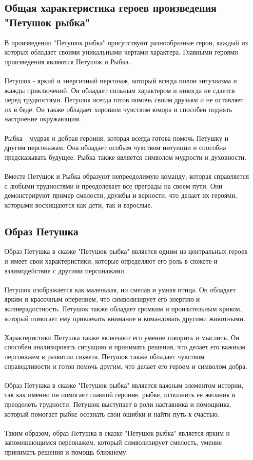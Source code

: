 \documentclass{article}
\begin{document}
\subsection{Общая характеристика героев произведения "{}{}Петушок рыбка"{}{}}
В произведении "{}{}Петушок рыбка"{}{} присутствуют разнообразные герои, каждый из которых обладает своими уникальными чертами характера. Главными героями произведения являются Петушок и Рыбка.\\
~\\
Петушок - яркий и энергичный персонаж, который всегда полон энтузиазма и жажды приключений. Он обладает сильным характером и никогда не сдается перед трудностями. Петушок всегда готов помочь своим друзьям и не оставляет их в беде. Он также обладает хорошим чувством юмора и способен поднять настроение окружающим.\\
~\\
Рыбка - мудрая и добрая героиня, которая всегда готова помочь Петушку и другим персонажам. Она обладает особым чувством интуиции и способна предсказывать будущее. Рыбка также является символом мудрости и духовности.\\
~\\
Вместе Петушок и Рыбка образуют непреодолимую команду, которая справляется с любыми трудностями и преодолевает все преграды на своем пути. Они демонстрируют пример смелости, дружбы и верности, что делает их героями, которыми восхищаются как дети, так и взрослые.
\subsection{Образ Петушка}
Образ Петушка в сказке "{}{}Петушок рыбка"{}{} является одним из центральных героев и имеет свои характеристики, которые определяют его роль в сюжете и взаимодействие с другими персонажами.\\
~\\
Петушок изображается как маленькая, но смелая и умная птица. Он обладает ярким и красочным оперением, что символизирует его энергию и жизнерадостность. Петушок также обладает громким и пронзительным криком, который помогает ему привлекать внимание и командовать другими животными.\\
~\\
Характеристики Петушка также включают его умение говорить и мыслить. Он способен анализировать ситуацию и принимать решения, что делает его важным персонажем в развитии сюжета. Петушок также обладает чувством справедливости и готов помочь другим, что делает его героем и символом добра.\\
~\\
Образ Петушка в сказке "{}{}Петушок рыбка"{}{} является важным элементом истории, так как именно он помогает главной героине, рыбке, исполнить ее желания и преодолеть трудности. Петушок выступает в роли наставника и помощника, который помогает рыбке осознать свои ошибки и найти путь к счастью.\\
~\\
Таким образом, образ Петушка в сказке "{}{}Петушок рыбка"{}{} является ярким и запоминающимся персонажем, который символизирует смелость, умение принимать решения и помощь ближнему.\\
~\\
\end{document}
